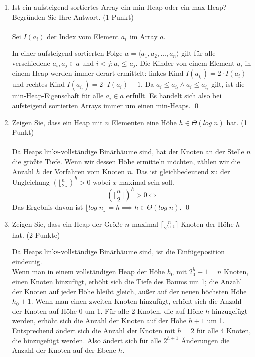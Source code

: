 \documentclass[ngerman,landscape,twocolumn]{adtexsheet}
\begin{document}
\begin{question}
    \begin{enumerate}
    \item Ist ein aufsteigend sortiertes Array ein min-Heap oder ein max-Heap? Begründen Sie Ihre Antwort. (1 Punkt) \\\\
        Sei $I(a_i)$ der Index vom Element $a_i$ im Array $a$.
        
        In einer aufsteigend sortierten Folge $a = \langle a_1, a_2, \ldots, a_n \rangle$ gilt für alle verschiedene $a_i, a_j \in a$ und $i < j : a_i \leq a_j$. Die Kinder von einem Element $a_i$ in einem Heap werden immer derart ermittelt: linkes Kind $ I(a_{i_l})= 2 \cdot I(a_i)$ und rechtes Kind $I(a_{i_r})= 2 \cdot I(a_i)+ 1$. Da $a_i \leq a_{i_l} \land a_i \leq a_{i_r}$ gilt, ist die min-Heap-Eigenschaft für alle $a_i \in a$ erfüllt. Es handelt sich also bei aufsteigend sortierten Arrays immer um einen min-Heaps. \qed
        
    \item Zeigen Sie, dass ein Heap mit $n$ Elementen eine Höhe $h \in \Theta(log \; n)$ hat. (1 Punkt) \\\\
        Da Heaps links-vollständige Binärbäume sind, hat der Knoten an der Stelle $n$ die größte Tiefe. Wenn wir dessen Höhe ermitteln möchten, zählen wir die Anzahl $h$ der Vorfahren vom Knoten $n$. Das ist gleichbedeutend zu der Ungleichung $(\lfloor \frac{n}{2} \rfloor)^h > 0$ wobei $x$ maximal sein soll.
\[
        (\lfloor \frac{n}{2} \rfloor)^h > 0
        \iff 
\]
        Das Ergebnis davon ist $\lfloor log \; n \rfloor = h \implies h \in \Theta(log \; n)$. \qed
    \item Zeigen Sie, dass ein Heap der Größe $n$ maximal $\lceil \frac{n}{2^{h+1}} \rceil$ Knoten der Höhe $h$ hat. (2 Punkte)
    
    Da Heaps links-vollständige Binärbäume sind, ist die Einfügeposition eindeutig.\\
    Wenn man in einem vollständigen Heap der Höhe $h_0$ mit $2^h_0-1=n$ Knoten, einen Knoten hinzufügt, erhöht sich die Tiefe des Baums um 1; die Anzahl der Knoten auf jeder Höhe bleibt gleich, außer auf der neuen höchsten Höhe $h_0+1$. Wenn man einen zweiten Knoten hinzufügt, erhöht sich die Anzahl der Knoten auf Höhe 0 um 1. Für alle 2 Knoten, die auf Höhe $h$ hinzugefügt werden, erhöht sich die Anzahl der Knoten auf der Höhe $h+1$ um 1. Entsprechend ändert sich die Anzahl der Knoten mit $h=2$ für alle 4 Knoten, die hinzugefügt werden.
    Also ändert sich für alle $2^{h+1}$ Änderungen die Anzahl der Knoten auf der Ebene $h$.
    

\end{enumerate}
\end{question}
\end{document}
